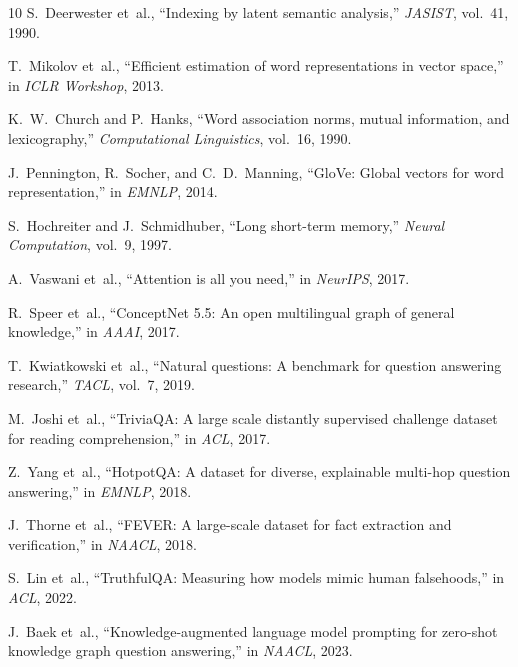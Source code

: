 \documentclass[conference]{IEEEtran}
\begin{document}
\begin{thebibliography}{10}
S.~Deerwester et~al., ``Indexing by latent semantic analysis,'' \emph{JASIST}, vol.~41, 1990.

T.~Mikolov et~al., ``Efficient estimation of word representations in vector space,'' in \emph{ICLR Workshop}, 2013.

K.~W.~Church and P.~Hanks, ``Word association norms, mutual information, and lexicography,'' \emph{Computational Linguistics}, vol.~16, 1990.

J.~Pennington, R.~Socher, and C.~D.~Manning, ``GloVe: Global vectors for word representation,'' in \emph{EMNLP}, 2014.

S.~Hochreiter and J.~Schmidhuber, ``Long short-term memory,'' \emph{Neural Computation}, vol.~9, 1997.

A.~Vaswani et~al., ``Attention is all you need,'' in \emph{NeurIPS}, 2017.

R.~Speer et~al., ``ConceptNet 5.5: An open multilingual graph of general knowledge,'' in \emph{AAAI}, 2017.

T.~Kwiatkowski et~al., ``Natural questions: A benchmark for question answering research,'' \emph{TACL}, vol.~7, 2019.

M.~Joshi et~al., ``TriviaQA: A large scale distantly supervised challenge dataset for reading comprehension,'' in \emph{ACL}, 2017.

Z.~Yang et~al., ``HotpotQA: A dataset for diverse, explainable multi-hop question answering,'' in \emph{EMNLP}, 2018.

J.~Thorne et~al., ``FEVER: A large-scale dataset for fact extraction and verification,'' in \emph{NAACL}, 2018.

S.~Lin et~al., ``TruthfulQA: Measuring how models mimic human falsehoods,'' in \emph{ACL}, 2022.

J.~Baek et~al., ``Knowledge-augmented language model prompting for zero-shot knowledge graph question answering,'' in \emph{NAACL}, 2023.

\end{thebibliography}
\end{document}
